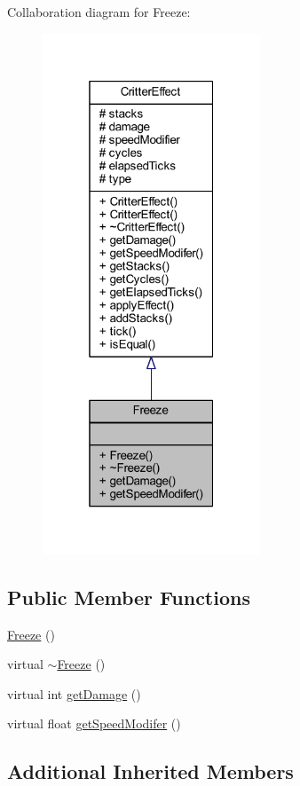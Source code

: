 Collaboration diagram for Freeze\+:\nopagebreak
\begin{figure}[H]
\begin{center}
\leavevmode
\includegraphics[width=184pt]{struct_freeze__coll__graph}
\end{center}
\end{figure}
\subsection*{Public Member Functions}
\begin{DoxyCompactItemize}
\item 
\hyperlink{struct_freeze_a839e6306b8df0bad3b9b075e693c6839}{Freeze} ()
\item 
virtual \hyperlink{struct_freeze_ad6ed341963440e0c02e9f37d5115a2de}{$\sim$\+Freeze} ()
\item 
virtual int \hyperlink{struct_freeze_a5f9b77d2b88bb5f945d476f4405569a3}{get\+Damage} ()
\item 
virtual float \hyperlink{struct_freeze_a47d5a9d0658cd1e8d25e174dca0b934b}{get\+Speed\+Modifer} ()
\end{DoxyCompactItemize}
\subsection*{Additional Inherited Members}


